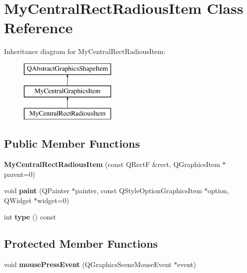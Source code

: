 \hypertarget{class_my_central_rect_radious_item}{}\section{My\+Central\+Rect\+Radious\+Item Class Reference}
\label{class_my_central_rect_radious_item}
Inheritance diagram for My\+Central\+Rect\+Radious\+Item\+:\begin{figure}[H]
\begin{center}
\leavevmode
\includegraphics[height=3.000000cm]{class_my_central_rect_radious_item}
\end{center}
\end{figure}
\subsection*{Public Member Functions}
\begin{DoxyCompactItemize}
\item 
\hypertarget{class_my_central_rect_radious_item_a746f17b384cddf85069bf50ef573de02}{}{\bfseries My\+Central\+Rect\+Radious\+Item} (const Q\+Rect\+F \&rect, Q\+Graphics\+Item $\ast$parent=0)\label{class_my_central_rect_radious_item_a746f17b384cddf85069bf50ef573de02}

\item 
\hypertarget{class_my_central_rect_radious_item_a6169e6c0d0a4736311fbc531abd4069e}{}void {\bfseries paint} (Q\+Painter $\ast$painter, const Q\+Style\+Option\+Graphics\+Item $\ast$option, Q\+Widget $\ast$widget=0)\label{class_my_central_rect_radious_item_a6169e6c0d0a4736311fbc531abd4069e}

\item 
\hypertarget{class_my_central_rect_radious_item_a1910592e03509484118253aed0ed8142}{}int {\bfseries type} () const \label{class_my_central_rect_radious_item_a1910592e03509484118253aed0ed8142}

\end{DoxyCompactItemize}
\subsection*{Protected Member Functions}
\begin{DoxyCompactItemize}
\item 
\hypertarget{class_my_central_rect_radious_item_aaf825576276007052dbbb3f21e2c71b8}{}void {\bfseries mouse\+Press\+Event} (Q\+Graphics\+Scene\+Mouse\+Event $\ast$event)\label{class_my_central_rect_radious_item_aaf825576276007052dbbb3f21e2c71b8}

\end{DoxyCompactItemize}
